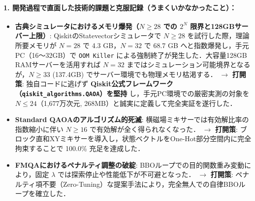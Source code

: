 \documentclass[11pt,a4paper]{ltjsarticle}
\begin{document}
\paragraph{1. 開発過程で直面した技術的課題と克服記録（うまくいかなかったこと）：}
\begin{itemize}\setlength{\itemsep}{1.5pt}
    \item \textbf{古典シミュレータにおけるメモリ爆発（$N \ge 28$ での $2^N$ 限界と128GBサーバー上限）}:
    QiskitのStatevectorシミュレータで $N \ge 28$ を試行した際，理論所要メモリが $N=28$ で 4.3 GB，$N=32$ で 68.7 GB へと指数爆発し，手元PC（16〜32GB）で \texttt{OOM Killer} による強制終了が発生した．大容量128GB RAMサーバーを活用すれば $N=32$ まではシミュレーション可能境界となるが，$N \ge 33$ (137.4GB) でサーバー環境でも物理メモリ枯渇する．
    $\to$ \textbf{打開策}: 独自コードに逃げず \textbf{Qiskit公式フレームワーク（\texttt{qiskit\_algorithms.QAOA}）を堅持} し，手元PC環境での厳密実測の対象を $N \le 24$（1,677万次元, 268MB）と誠実に定義して完全実証を遂行した．

    \item \textbf{Standard QAOAのアルゴリズム的死滅}:
    横磁場ミキサーでは有効解比率の指数縮小に伴い $N \ge 16$ で有効解が全く得られなくなった．
    $\to$ \textbf{打開策}: ブロック直和XYミキサーを導入し，状態ベクトルをOne-Hot部分空間内に完全拘束することで 100.0\% 充足を達成した．

    \item \textbf{FMQAにおけるペナルティ調整の破綻}:
    BBOループでの目的関数重み変動により，固定 $\lambda$ では探索停止や性能低下が不可避となった．
    $\to$ \textbf{打開策}: ペナルティ項不要（Zero-Tuning）な提案手法により，完全無人での自律BBOループを確立した．
\end{itemize}
\end{document}

